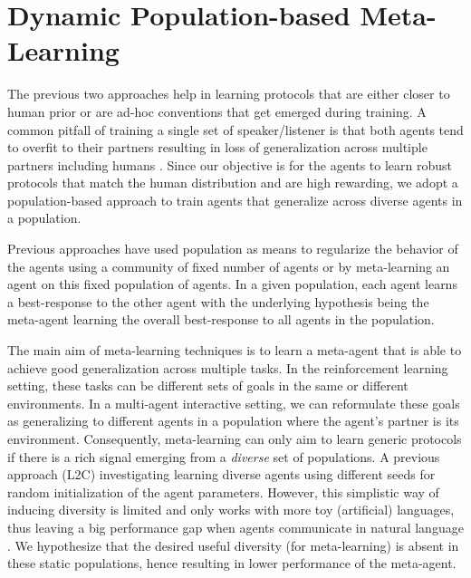 \documentclass{article}
\newcommand{\ltc}{\textsc{L2C\xspace}}
\begin{document}
\section{Dynamic Population-based Meta-Learning}
\label{sec:meta-learning}

The previous two approaches help in learning protocols that are either closer to human prior or are ad-hoc conventions that get emerged during training. A common pitfall of training a single set of speaker/listener is that both agents tend to overfit to their partners resulting in loss of generalization across multiple partners including humans \citep{fitzgerald2019populate,cogswell_emergence_2019,li_ease--teaching_2019}. Since our objective is for the agents to learn robust protocols that match the human distribution and are high rewarding, we adopt a population-based approach to train agents that generalize across diverse agents in a population. 

Previous approaches have used population as means to regularize the behavior of the agents using a community of fixed number of agents \citep{tieleman_shaping_2018} or by meta-learning an agent on this fixed population of agents. In a given population, each agent learns a best-response to the other agent with the underlying hypothesis being the meta-agent learning the overall best-response to all agents in the population. 

The main aim of meta-learning techniques \citep{NIPS2016_90e13578,pmlr-v48-santoro16,DBLP:conf/iclr/RaviL17,finn_model-agnostic_2017} is to learn a meta-agent that is able to achieve good generalization across multiple tasks. In the reinforcement learning setting, these tasks can be different sets of goals in the same or different environments. In a multi-agent interactive setting, we can reformulate these goals as generalizing to different agents in a population where the agent's partner is its environment. Consequently, meta-learning can only aim to learn generic protocols if there is a rich signal emerging from a \textit{diverse} set of populations. A previous approach \citep{lowe_learning_2019} (\ltc) investigating learning diverse agents using different seeds for random initialization of the agent parameters. However, this simplistic way of inducing diversity is limited and only works with more toy (artificial) languages, thus leaving a big performance gap when agents communicate in natural language \citep{lowe*2020on}. We hypothesize that the desired useful diversity (for meta-learning) is absent in these static populations, hence resulting in lower performance of the meta-agent.
\end{document}
